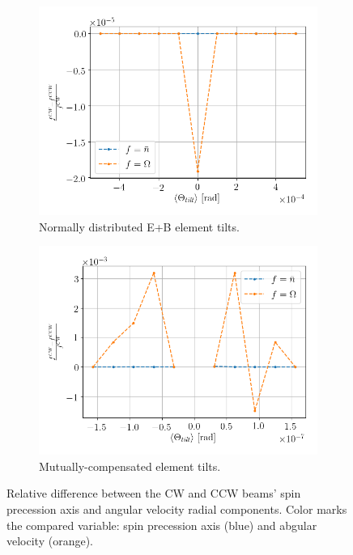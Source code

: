 \begin{figure}[!h]
	\centering
	\begin{subfigure}{\linewidth}
		\includegraphics[height=.35\paperheight]{images/fake_signal_sim/linearity_test_shifting_gauss_rel_diff}	
		\caption{Normally distributed E+B element tilts.}
	\end{subfigure}
	\begin{subfigure}{\linewidth}
		\includegraphics[height=.35\paperheight]{images/fake_signal_sim/linearity_test_compensated+microrad_rel_diff}
		\caption{Mutually-compensated element tilts.}
	\end{subfigure}
	\caption{Relative difference between the CW and CCW beams' spin precession axis and angular velocity radial components.
		Color marks the compared variable: spin precession axis (blue) and abgular velocity (orange).\label{fig:Lin_test_rel_diff}}
\end{figure}
